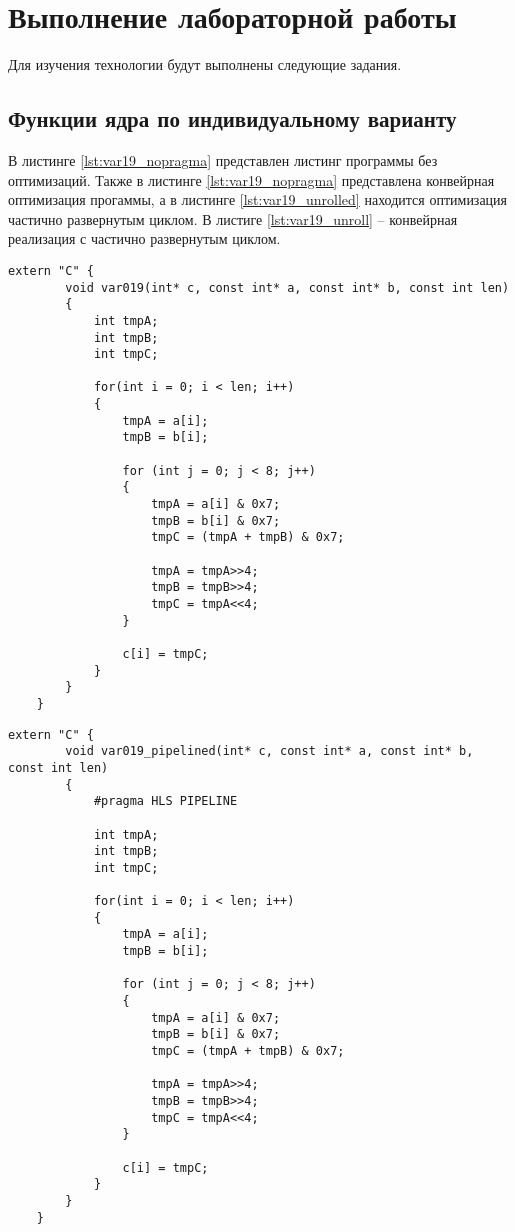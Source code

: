 \chapter{Выполнение лабораторной работы}

Для изучения технологии будут выполнены следующие задания.

\section{Функции ядра по индивидуальному варианту}

В листинге \ref{lst:var19_nopragma} представлен листинг программы без оптимизаций. Также в листинге \ref{lst:var19_nopragma} представлена конвейрная оптимизация прогаммы, а в листинге \ref{lst:var19_unrolled} находится оптимизация частично развернутым циклом. В листиге \ref{lst:var19_unroll} -- конвейрная реализация с частично развернутым циклом.


\begin{center}
    \captionsetup{justification=raggedright,singlelinecheck=off}
    \begin{lstlisting}[label=lst:var19_nopragma,caption=Код программы (без изменений)]
	extern "C" {
		void var019(int* c, const int* a, const int* b, const int len) 
		{
			int tmpA;
			int tmpB;
			int tmpC;

			for(int i = 0; i < len; i++)
			{
				tmpA = a[i];
				tmpB = b[i];

				for (int j = 0; j < 8; j++)
				{
					tmpA = a[i] & 0x7;
					tmpB = b[i] & 0x7;
					tmpC = (tmpA + tmpB) & 0x7;
					
					tmpA = tmpA>>4;
					tmpB = tmpB>>4;
					tmpC = tmpA<<4;
				}

				c[i] = tmpC;
			}
		}
	}
\end{lstlisting}
\end{center}


\begin{center}
    \captionsetup{justification=raggedright,singlelinecheck=off}
    \begin{lstlisting}[label=lst:var19_pipelined,caption=Код программы (конверная)]
	extern "C" {
		void var019_pipelined(int* c, const int* a, const int* b, const int len) 
		{
			#pragma HLS PIPELINE
	
			int tmpA;
			int tmpB;
			int tmpC;
	
			for(int i = 0; i < len; i++)
			{
				tmpA = a[i];
				tmpB = b[i];
	
				for (int j = 0; j < 8; j++)
				{
					tmpA = a[i] & 0x7;
					tmpB = b[i] & 0x7;
					tmpC = (tmpA + tmpB) & 0x7;
					
					tmpA = tmpA>>4;
					tmpB = tmpB>>4;
					tmpC = tmpA<<4;
				}
	
				c[i] = tmpC;
			}
		}
	}		
\end{lstlisting}
\end{center}


